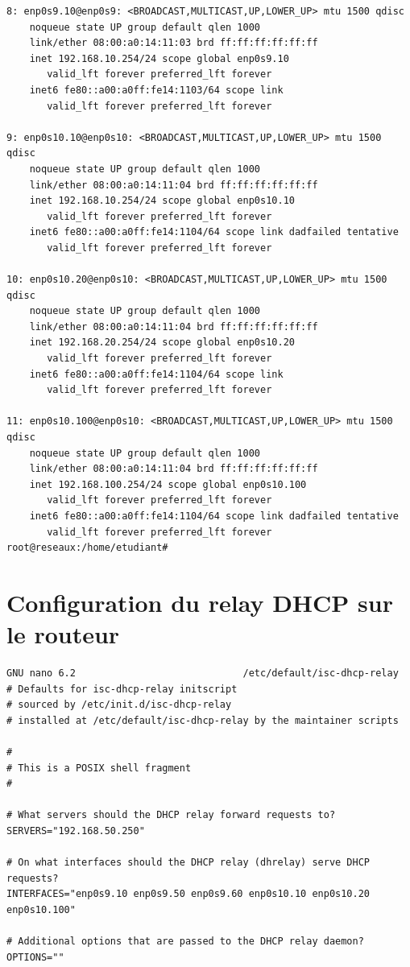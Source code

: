 \documentclass[a4paper,12pt]{report}
\begin{document}
\begin{verbatim}
8: enp0s9.10@enp0s9: <BROADCAST,MULTICAST,UP,LOWER_UP> mtu 1500 qdisc 
    noqueue state UP group default qlen 1000
    link/ether 08:00:a0:14:11:03 brd ff:ff:ff:ff:ff:ff
    inet 192.168.10.254/24 scope global enp0s9.10
       valid_lft forever preferred_lft forever
    inet6 fe80::a00:a0ff:fe14:1103/64 scope link 
       valid_lft forever preferred_lft forever

9: enp0s10.10@enp0s10: <BROADCAST,MULTICAST,UP,LOWER_UP> mtu 1500 qdisc 
    noqueue state UP group default qlen 1000
    link/ether 08:00:a0:14:11:04 brd ff:ff:ff:ff:ff:ff
    inet 192.168.10.254/24 scope global enp0s10.10
       valid_lft forever preferred_lft forever
    inet6 fe80::a00:a0ff:fe14:1104/64 scope link dadfailed tentative 
       valid_lft forever preferred_lft forever

10: enp0s10.20@enp0s10: <BROADCAST,MULTICAST,UP,LOWER_UP> mtu 1500 qdisc 
    noqueue state UP group default qlen 1000
    link/ether 08:00:a0:14:11:04 brd ff:ff:ff:ff:ff:ff
    inet 192.168.20.254/24 scope global enp0s10.20
       valid_lft forever preferred_lft forever
    inet6 fe80::a00:a0ff:fe14:1104/64 scope link 
       valid_lft forever preferred_lft forever

11: enp0s10.100@enp0s10: <BROADCAST,MULTICAST,UP,LOWER_UP> mtu 1500 qdisc 
    noqueue state UP group default qlen 1000
    link/ether 08:00:a0:14:11:04 brd ff:ff:ff:ff:ff:ff
    inet 192.168.100.254/24 scope global enp0s10.100
       valid_lft forever preferred_lft forever
    inet6 fe80::a00:a0ff:fe14:1104/64 scope link dadfailed tentative 
       valid_lft forever preferred_lft forever
root@reseaux:/home/etudiant# 
            \end{verbatim}
            \section{Configuration du relay DHCP sur le routeur}
            \begin{verbatim}
GNU nano 6.2                             /etc/default/isc-dhcp-relay                                      
# Defaults for isc-dhcp-relay initscript
# sourced by /etc/init.d/isc-dhcp-relay
# installed at /etc/default/isc-dhcp-relay by the maintainer scripts

#
# This is a POSIX shell fragment
#

# What servers should the DHCP relay forward requests to?
SERVERS="192.168.50.250"

# On what interfaces should the DHCP relay (dhrelay) serve DHCP requests?
INTERFACES="enp0s9.10 enp0s9.50 enp0s9.60 enp0s10.10 enp0s10.20 enp0s10.100"

# Additional options that are passed to the DHCP relay daemon?
OPTIONS=""
            \end{verbatim}
\end{document}
